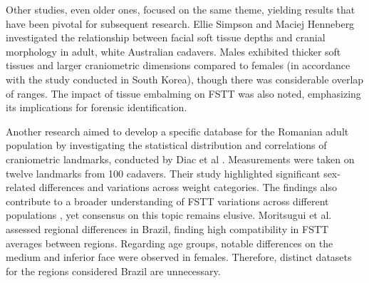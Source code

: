 \documentclass[journal,article,submit,pdftex,moreauthors]{Definitions/mdpi}
\begin{document}
Other studies, even older ones, focused on the same theme, yielding results that have been pivotal for subsequent research. Ellie Simpson and Maciej Henneberg \cite{ref20} investigated the relationship between facial soft tissue depths and cranial morphology in adult, white Australian cadavers. %
Males exhibited thicker soft tissues and larger craniometric dimensions compared to females (in accordance with the study conducted in South Korea), though there was considerable overlap of ranges. The impact of tissue embalming on FSTT was also noted, emphasizing its implications for forensic identification.

Another research aimed to develop a specific database for the Romanian adult population by investigating the statistical distribution and correlations of craniometric landmarks, conducted by Diac et al \cite{ref21}. %
Measurements were taken on twelve landmarks from 100 cadavers. %
Their study highlighted significant sex-related differences and variations across weight categories. The findings also contribute to a broader understanding of FSTT variations across different populations \citep{ref13,ref22,ref23,ref24,ref25}, yet consensus on this topic remains elusive.
Moritsugui et al. \cite{ref26} assessed regional differences in Brazil, finding high compatibility in FSTT averages between regions. %
Regarding age groups, notable differences on the medium and inferior face were observed in females. Therefore, distinct datasets for the regions considered Brazil are unnecessary.
\end{document}
